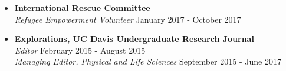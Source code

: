 \documentclass[line,margin,10pt]{res}
\begin{document}
\begin{resume}
\begin{itemize}
\item [] \textbf{International Rescue Committee} \\ {\sl Refugee Empowerment Volunteer} \hfill January 2017 - October 2017

\item [] \textbf{Explorations, UC Davis Undergraduate Research Journal} \\
{\sl Editor} \hfill February 2015 - August 2015\\
{\sl Managing Editor, Physical and Life Sciences} \hfill September 2015 - June 2017
  



\end{itemize}
 

\end{resume}
\end{document}
